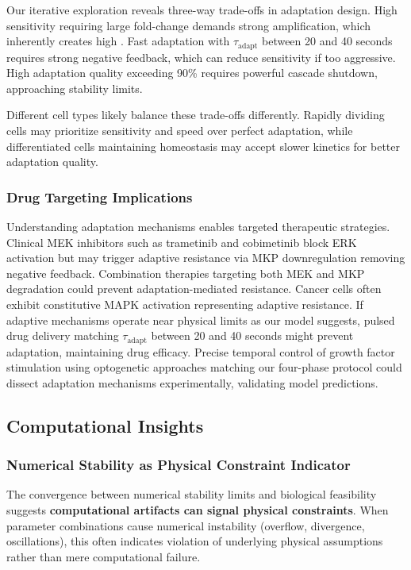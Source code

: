 \documentclass[twocolumn,11pt]{article}
\newcommand{\erk}{ERK}
\newcommand{\mkp}{MKP}
\newcommand{\mapk}{MAPK}
\newcommand{\srr}{\text{SRR}}
\begin{document}
Our iterative exploration reveals three-way trade-offs in adaptation design. High sensitivity requiring large fold-change demands strong amplification, which inherently creates high \srr{}. Fast adaptation with $\tau_{\text{adapt}}$ between 20 and 40 seconds requires strong negative feedback, which can reduce sensitivity if too aggressive. High adaptation quality exceeding 90\% requires powerful cascade shutdown, approaching stability limits.

Different cell types likely balance these trade-offs differently. Rapidly dividing cells may prioritize sensitivity and speed over perfect adaptation, while differentiated cells maintaining homeostasis may accept slower kinetics for better adaptation quality.

\subsubsection{Drug Targeting Implications}

Understanding adaptation mechanisms enables targeted therapeutic strategies. Clinical MEK inhibitors such as trametinib and cobimetinib block \erk{} activation but may trigger adaptive resistance via \mkp{} downregulation removing negative feedback. Combination therapies targeting both MEK and \mkp{} degradation could prevent adaptation-mediated resistance. Cancer cells often exhibit constitutive \mapk{} activation representing adaptive resistance. If adaptive mechanisms operate near physical limits as our model suggests, pulsed drug delivery matching $\tau_{\text{adapt}}$ between 20 and 40 seconds might prevent adaptation, maintaining drug efficacy. Precise temporal control of growth factor stimulation using optogenetic approaches matching our four-phase protocol could dissect adaptation mechanisms experimentally, validating model predictions.

\subsection{Computational Insights}

\subsubsection{Numerical Stability as Physical Constraint Indicator}

The convergence between numerical stability limits and biological feasibility suggests \textbf{computational artifacts can signal physical constraints}. When parameter combinations cause numerical instability (overflow, divergence, oscillations), this often indicates violation of underlying physical assumptions rather than mere computational failure.
\end{document}
